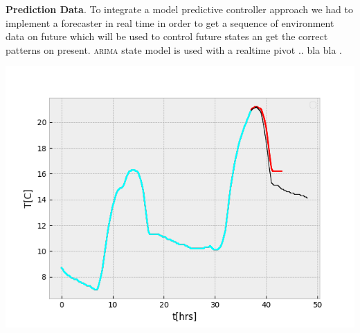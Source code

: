       \textbf{Prediction Data}.
      To integrate a model predictive controller approach we had to implement 
      a forecaster in real time in order to get a sequence of environment data
      on future which will be used to control future states an get the correct
      patterns on present. \textsc{arima} state model is used with a realtime 
      pivot .. bla bla .
      \begin{minipage}{\linewidth}
        \begin{center}
            \includegraphics[width=0.7\linewidth]{images/prediction}
            \label{prediction_environment}
        \end{center}
      \end{minipage}
      \clearpage
  

